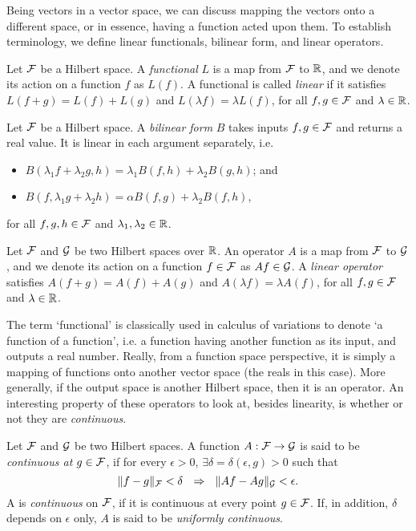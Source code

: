Being vectors in a vector space, we can discuss mapping the vectors onto a different space, or in essence, having a function acted upon them.
To establish terminology, we define linear functionals, bilinear form, and linear operators.

\begin{definition}
  Let ${\mathcal F}$ be a Hilbert space.
  A \emph{functional} $L$ is a map from ${\mathcal F}$ to $\mathbb{R}$, and we denote its action on a function $f$ as $L(f)$. 
  A functional is called \emph{linear} if it satisfies $L(f+g)=L(f)+L(g)$ and $L(\lambda f)=\lambda L(f)$, for all $f,g\in{\mathcal F}$ and $\lambda\in\mathbb{R}$.
\end{definition}

\begin{definition}
  Let ${\mathcal F}$ be a Hilbert space.
  A \emph{bilinear form} $B$ takes inputs $f,g\in{\mathcal F}$ and returns a real value.
  It is linear in each argument separately, i.e.
  \begin{itemize}
    \item $B(\lambda_1 f +\lambda_2 g, h) = \lambda_1 B(f,h) + \lambda_2 B(g,h)$; and
    \item $B(f, \lambda_1 g +\lambda_2 h) = \alpha B(f,g) + \lambda_2 B(f,h)$,
  \end{itemize} 
  for all $f,g,h \in {\mathcal F}$ and $\lambda_1,\lambda_2\in\mathbb{R}$.
\end{definition}

\begin{definition}
  Let ${\mathcal F}$ and ${\mathcal G}$ be two Hilbert spaces over $\mathbb{R}$.
  An operator $A$ is a map from ${\mathcal F}$ to ${\mathcal G}$, and we denote its action on a function $f \in{\mathcal F}$ as $Af \in {\mathcal G}$.
  A \emph{linear operator} satisfies $A(f+g) = A(f) + A(g)$ and $A(\lambda f) = \lambda A(f)$, for all $f,g \in{\mathcal F}$ and $\lambda\in\mathbb{R}$.
\end{definition}

The term `functional' is classically used in calculus of variations to denote `a function of a function', i.e. a function having another function as its input, and outputs a real number.
Really, from a function space perspective, it is simply a mapping of functions onto another vector space (the reals in this case).
More generally, if the output space is another Hilbert space, then it is an operator.
An interesting property of these operators to look at, besides linearity, is whether or not they are \emph{continuous}.

\begin{definition}[Continuity]\label{def:continuity}
  Let ${\mathcal F}$ and ${\mathcal G}$ be two Hilbert spaces.
  A function $A:{\mathcal F}\to{\mathcal G}$ is said to be \emph{continuous at $g\in{\mathcal F}$}, if for every $\epsilon>0$, $\exists \delta=\delta(\epsilon,g)>0$ such that
  \[
    \norm{f-g}_\cF < \delta \ \ \Rightarrow \ \ \norm{Af - Ag}_\cG < \epsilon.
  \]
  A is \emph{continuous} on ${\mathcal F}$, if it is continuous at every point $g \in{\mathcal F}$.
  If, in addition, $\delta$ depends on $\epsilon$ only, $A$ is said to be \emph{uniformly continuous}.
\end{definition}

